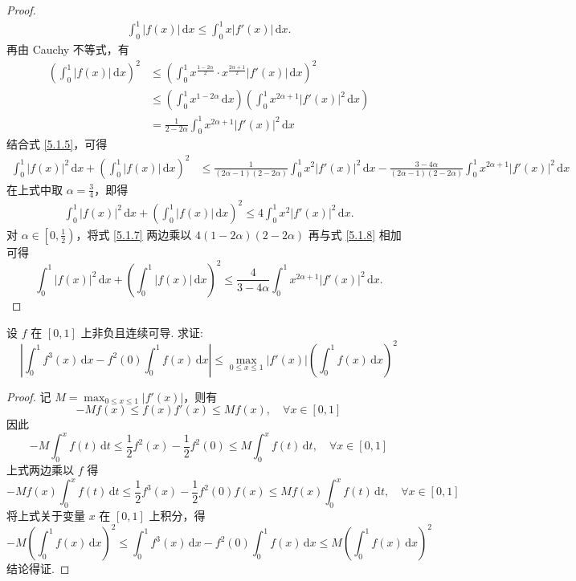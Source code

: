 \documentclass[../../main.tex]{subfiles}
\begin{document}
\begin{proof}
\begin{align}
\int_{0}^{1} |f(x)| \, \mathrm{d}x \leqslant \int_{0}^{1} x |f'(x)| \, \mathrm{d}x. \label{5.1.6}
\end{align}
再由 Cauchy 不等式，有
\begin{align*}
\left( \int_{0}^{1} |f(x)| \, \mathrm{d}x \right)^2 &\leqslant \left( \int_{0}^{1} x^{\frac{1 - 2\alpha}{2}} \cdot x^{\frac{2\alpha + 1}{2}} |f'(x)| \, \mathrm{d}x \right)^2 \\
&\leqslant \left( \int_{0}^{1} x^{1 - 2\alpha} \, \mathrm{d}x \right) \left( \int_{0}^{1} x^{2\alpha + 1} |f'(x)|^2 \, \mathrm{d}x \right)
\\
&= \frac{1}{2 - 2\alpha} \int_{0}^{1} x^{2\alpha + 1} |f'(x)|^2 \, \mathrm{d}x
\end{align*}
结合式 \eqref{5.1.5}，可得
\begin{align}
\int_{0}^{1} |f(x)|^2 \, \mathrm{d}x + \left( \int_{0}^{1} |f(x)| \, \mathrm{d}x \right)^2 &\leqslant \frac{1}{(2\alpha - 1)(2 - 2\alpha)} \int_{0}^{1} x^2 |f'(x)|^2 \, \mathrm{d}x - \frac{3 - 4\alpha}{(2\alpha - 1)(2 - 2\alpha)} \int_{0}^{1} x^{2\alpha + 1} |f'(x)|^2 \, \mathrm{d}x \label{5.1.7}
\end{align}
在上式中取 \( \alpha = \frac{3}{4} \)，即得
\begin{align}
\int_{0}^{1} |f(x)|^2 \, \mathrm{d}x + \left( \int_{0}^{1} |f(x)| \, \mathrm{d}x \right)^2 \leqslant 4 \int_{0}^{1} x^2 |f'(x)|^2 \, \mathrm{d}x .\label{5.1.8}
\end{align}
对 \( \alpha \in \left[0, \frac{1}{2}\right) \)，将式 \eqref{5.1.7} 两边乘以 \( 4(1 - 2\alpha)(2 - 2\alpha) \) 再与式 \eqref{5.1.8} 相加可得
\[
\int_{0}^{1} |f(x)|^2 \, \mathrm{d}x + \left( \int_{0}^{1} |f(x)| \, \mathrm{d}x \right)^2 \leqslant \frac{4}{3 - 4\alpha} \int_{0}^{1} x^{2\alpha + 1} |f'(x)|^2 \, \mathrm{d}x.
\]

\end{proof}

\begin{example}
设 \( f \) 在 \([0,1]\) 上非负且连续可导. 求证:
\[
\left| \int_{0}^{1} f^3(x) \, \mathrm{d}x - f^2(0) \int_{0}^{1} f(x) \, \mathrm{d}x \right| \leqslant \max_{0 \leqslant x \leqslant 1} |f'(x)| \left( \int_{0}^{1} f(x) \, \mathrm{d}x \right)^2
\]
\end{example}
\begin{proof}
记 \( M = \max_{0 \leqslant x \leqslant 1} |f'(x)| \)，则有
\[
-M f(x) \leqslant f(x) f'(x) \leqslant M f(x), \quad \forall x \in [0,1]
\]
因此
\[
-M \int_{0}^{x} f(t) \, \mathrm{d}t \leqslant \frac{1}{2} f^2(x) - \frac{1}{2} f^2(0) \leqslant M \int_{0}^{x} f(t) \, \mathrm{d}t, \quad \forall x \in [0,1]
\]
上式两边乘以 \( f \) 得
\[
-M f(x) \int_{0}^{x} f(t) \, \mathrm{d}t \leqslant \frac{1}{2} f^3(x) - \frac{1}{2} f^2(0) f(x) \leqslant M f(x) \int_{0}^{x} f(t) \, \mathrm{d}t, \quad \forall x \in [0,1]
\]
将上式关于变量 \( x \) 在 \([0,1]\) 上积分，得
\[
-M \left( \int_{0}^{1} f(x) \, \mathrm{d}x \right)^2 \leqslant \int_{0}^{1} f^3(x) \, \mathrm{d}x - f^2(0) \int_{0}^{1} f(x) \, \mathrm{d}x \leqslant M \left( \int_{0}^{1} f(x) \, \mathrm{d}x \right)^2
\]
结论得证.

\end{proof}
\end{document}

